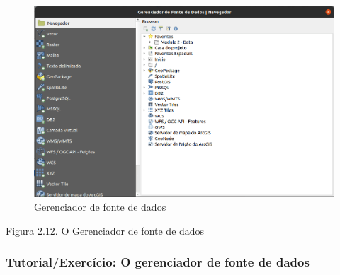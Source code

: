 \documentclass[
]{krantz}
\begin{document}
\begin{figure}
\centering
\includegraphics{media/modulo2/data-source-manager-1.png}
\caption{Gerenciador de fonte de dados}
\end{figure}

Figura 2.12. O Gerenciador de fonte de dados

\hypertarget{tutorialexercuxedcio-o-gerenciador-de-fonte-de-dados}{%
\subsubsection{Tutorial/Exercício: O gerenciador de fonte de dados}\label{tutorialexercuxedcio-o-gerenciador-de-fonte-de-dados}}
\end{document}
